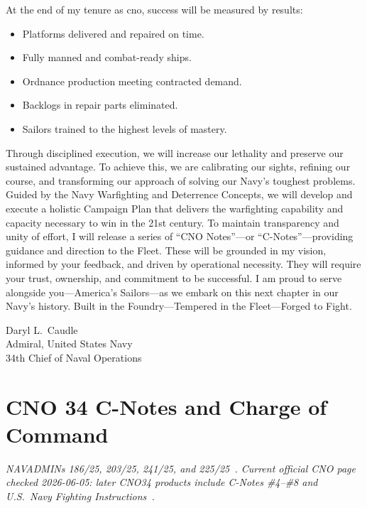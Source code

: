 \documentclass[../main.tex]{subfiles}
\begin{document}
\begin{description}[style=nextline, labelsep=0.5em, font=\bfseries]
  \item[\textbf{Theory of victory.}] At the end of my tenure as \ac{cno}, success will be measured by results:
        \begin{itemize}
          \item Platforms delivered and repaired on time.
          \item Fully manned and combat-ready ships.
          \item Ordnance production meeting contracted demand.
          \item Backlogs in repair parts eliminated.
          \item Sailors trained to the highest levels of mastery.
        \end{itemize}
        Through disciplined execution, we will increase our lethality and preserve our sustained advantage. To achieve this, we are calibrating our sights, refining our course, and transforming our approach of solving our Navy's toughest problems. Guided by the Navy Warfighting and Deterrence Concepts, we will develop and execute a holistic Campaign Plan that delivers the warfighting capability and capacity necessary to win in the 21st century. To maintain transparency and unity of effort, I will release a series of ``CNO Notes''---or ``C-Notes''---providing guidance and direction to the Fleet. These will be grounded in my vision, informed by your feedback, and driven by operational necessity. They will require your trust, ownership, and commitment to be successful. I am proud to serve alongside you---America's Sailors---as we embark on this next chapter in our Navy's history. Built in the Foundry---Tempered in the Fleet---Forged to Fight.

        \medskip
        Daryl L.\ Caudle\\
        Admiral, United States Navy\\
        34th Chief of Naval Operations
\end{description}

\section{CNO 34 C-Notes and Charge of Command}\label{app:cno34-cnotes}
\emph{\footnotesize NAVADMINs 186/25, 203/25, 241/25, and 225/25~\autocite{cno-cnote-1-2025,cno-cnote-2-2025,cno-cnote-3-2025,cno-charge-of-command-2025}. Current official CNO page checked 2026-06-05: later CNO34 products include C-Notes \#4--\#8 and U.S.\ Navy Fighting Instructions~\autocite{cno-cnotes-landing-2026,cno-cnote-4-2026,cno-cnote-5-2026,cno-cnote-6-2026,cno-cnote-7-2026,cno-cnote-8-2026,cno-fighting-instructions-2026}.}
\end{document}
